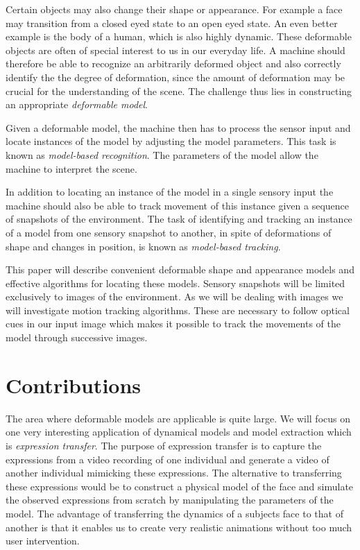 \documentclass[11pt,a4paper,twoside]{report}
\begin{document}
Certain objects may also change their shape or
appearance. For example a face may transition from a closed eyed state to an
open eyed state. An even better example is the body of a human, which is also
highly dynamic. These deformable objects are often of special interest to us in
our everyday life. A machine should therefore be able to recognize an arbitrarily deformed
object and also correctly identify the the degree of deformation, since the amount of deformation may be crucial for the understanding of
the scene. The challenge thus lies in constructing an appropriate \textit{deformable
model}. 

Given a deformable model, the machine then has to process the sensor input and
locate instances of the model by adjusting the model parameters. This task is
known as \textit{model-based recognition}. The parameters of the model allow the
machine to interpret the scene. 

In addition to locating an instance of the model
in a single sensory input the machine should also be able to track movement of
this instance given a sequence of snapshots of
the environment. The task of identifying and tracking an instance of a model from
one sensory snapshot to another, in spite of deformations of shape
and changes in position, is known as \textit{model-based tracking}.

This paper will describe convenient deformable shape
and appearance models and effective algorithms for locating these
models. Sensory snapshots will be limited exclusively to images of the environment. As we will be dealing
with images we will investigate motion tracking algorithms. These are necessary
to follow optical cues in our input image which makes it possible to track the
movements of the model through successive images.

\section{Contributions}

The area where deformable models are applicable is quite large. We will focus on one very interesting application of dynamical
models and model extraction which is
\textit{expression transfer}. The purpose of expression transfer is to capture
the expressions from a video recording of one individual and
generate a video of another individual mimicking these
expressions. The alternative to transferring these expressions would
be to construct a physical model of the face and simulate the observed
expressions from scratch by manipulating the parameters of the model. The
advantage of transferring the dynamics of a subjects face to that of another is
that it enables us to
create very realistic animations without too much user intervention. 
\end{document}
